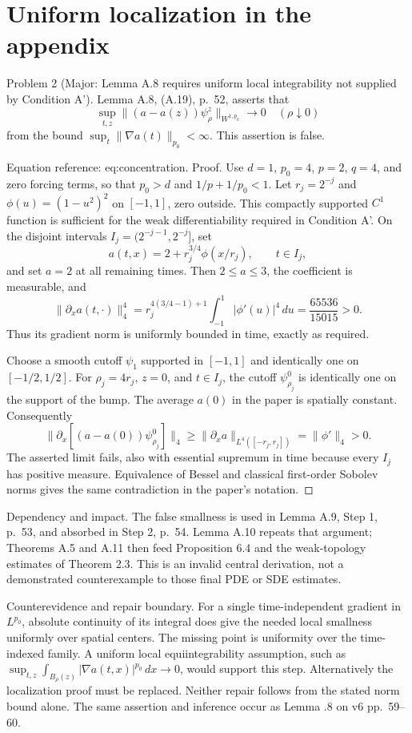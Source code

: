 \documentclass[10pt]{article}
\begin{document}
\section*{Uniform localization in the appendix}
Problem 2 (Major: Lemma A.8 requires uniform local integrability not supplied by Condition A’).  Lemma A.8, (A.19), p. 52, asserts that \[\sup_{t,z}\|(a-a(z))\psi_\rho^z\|_{W^{1,p_0}}\longrightarrow0
\quad(\rho\downarrow0)\] from the bound \(\sup_t\|\nabla a(t)\|_{p_0}<\infty\). This assertion is false.\par
Equation reference: eq:concentration. Proof. Use \(d=1\), \(p_0=4\), \(p=2\), \(q=4\), and zero forcing terms, so that \(p_0>d\) and \(1/p+1/p_0<1\). Let \(r_j=2^{-j}\) and \(\phi(u)=(1-u^2)^2\) on \([-1,1]\), zero outside. This compactly supported \(C^1\) function is sufficient for the weak differentiability required in Condition A’. On the disjoint intervals \(I_j=(2^{-j-1},2^{-j}]\), set \[
a(t,x)=2+r_j^{3/4}\phi(x/r_j),\qquad t\in I_j,\] and set \(a=2\) at all remaining times. Then \(2\leq a\leq3\), the coefficient is measurable, and \[\|\partial_xa(t,\cdot)\|_4^4
=r_j^{4(3/4-1)+1}\int_{-1}^1|\phi'(u)|^4\,du
=\frac{65536}{15015}>0.\] Thus its gradient norm is uniformly bounded in time, exactly as required.\par
Choose a smooth cutoff \(\psi_1\) supported in \([-1,1]\) and identically one on \([-1/2,1/2]\). For \(\rho_j=4r_j\), \(z=0\), and \(t\in I_j\), the cutoff \(\psi_{\rho_j}^0\) is identically one on the support of the bump. The average \(a(0)\) in the paper is spatially constant. Consequently \[\|\partial_x[(a-a(0))\psi_{\rho_j}^0]\|_4
\geq \|\partial_xa\|_{L^4([-r_j,r_j])}
=\|\phi'\|_4>0.\] The asserted limit fails, also with essential supremum in time because every \(I_j\) has positive measure. Equivalence of Bessel and classical first-order Sobolev norms gives the same contradiction in the paper’s notation. ◻\par
Dependency and impact. The false smallness is used in Lemma A.9, Step 1, p. 53, and absorbed in Step 2, p. 54. Lemma A.10 repeats that argument; Theorems A.5 and A.11 then feed Proposition 6.4 and the weak-topology estimates of Theorem 2.3. This is an invalid central derivation, not a demonstrated counterexample to those final PDE or SDE estimates.\par
Counterevidence and repair boundary. For a single time-independent gradient in \(L^{p_0}\), absolute continuity of its integral does give the needed local smallness uniformly over spatial centers. The missing point is uniformity over the time-indexed family. A uniform local equiintegrability assumption, such as \(\sup_{t,z}\int_{B_\rho(z)}|\nabla a(t,x)|^{p_0}\,dx\to0\), would support this step. Alternatively the localization proof must be replaced. Neither repair follows from the stated norm bound alone. The same assertion and inference occur as Lemma .8 on v6 pp. 59–60.\par
\end{document}
